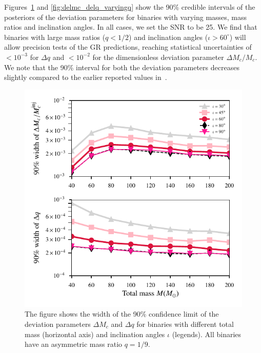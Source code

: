 \documentclass[prd,preprintnumbers,twocolumn,eqsecnum,floatfix,a4paper,nofootinbib,superscriptaddress]{revtex4}
\begin{document}
 Figures~\ref{fig:delmc_delq_varyingM} and \ref{fig:delmc_delq_varyingq} show the 90\% credible intervals of the posteriors of the deviation parameters for binaries with varying masses, mass ratios and inclination angles. In all cases, we set the SNR to be {25}.  We find that binaries with large mass ratios ($q < 1/ 2$) and inclination angles ($\iota > 60 ^\circ $) will allow precision tests of the GR predictions, reaching statistical uncertainties of $< 10^{-3}$ for $\Delta q$ and $< 10^{-2}$ for the dimensionless deviation parameter $\Delta M_c/M_c$. We note that the 90\% interval for both the deviation parameters decreases slightly compared to the earlier reported values in~\cite{dhanpal2018}.
 
 \begin{figure}[tbh]
 	\begin{center}
 		\includegraphics[scale=0.8]{figs/hm_9dim_dmcbymcinj_dq_diff_M.pdf}
 	\end{center} 
 	\caption{The figure shows the width of the 90$\%$ confidence limit of the deviation parameters $\Delta M_c$ and $\Delta q$ for binaries with different total mass (horizontal axis) and inclination angles $\iota$ (legends). All binaries have an asymmetric mass ratio $q=1/9$.}
 	\label{fig:delmc_delq_varyingM}
 \end{figure}
 
\end{document}
